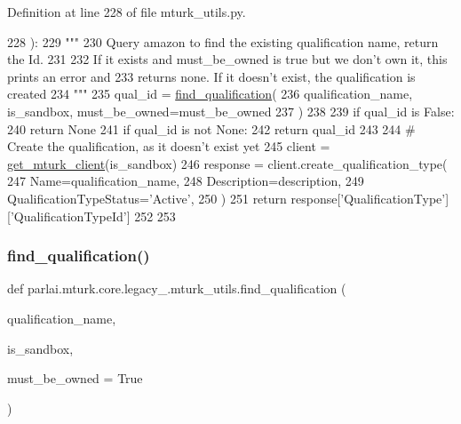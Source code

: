 Definition at line 228 of file mturk\+\_\+utils.\+py.


\begin{DoxyCode}
228 ):
229     \textcolor{stringliteral}{"""}
230 \textcolor{stringliteral}{    Query amazon to find the existing qualification name, return the Id.}
231 \textcolor{stringliteral}{}
232 \textcolor{stringliteral}{    If it exists and must\_be\_owned is true but we don't own it, this prints an error and}
233 \textcolor{stringliteral}{    returns none. If it doesn't exist, the qualification is created}
234 \textcolor{stringliteral}{    """}
235     qual\_id = \hyperlink{namespaceparlai_1_1mturk_1_1core_1_1mturk__utils_a54121023abc81124ba03cc50d5f23af3}{find\_qualification}(
236         qualification\_name, is\_sandbox, must\_be\_owned=must\_be\_owned
237     )
238 
239     \textcolor{keywordflow}{if} qual\_id \textcolor{keywordflow}{is} \textcolor{keyword}{False}:
240         \textcolor{keywordflow}{return} \textcolor{keywordtype}{None}
241     \textcolor{keywordflow}{if} qual\_id \textcolor{keywordflow}{is} \textcolor{keywordflow}{not} \textcolor{keywordtype}{None}:
242         \textcolor{keywordflow}{return} qual\_id
243 
244     \textcolor{comment}{# Create the qualification, as it doesn't exist yet}
245     client = \hyperlink{namespaceparlai_1_1mturk_1_1core_1_1mturk__utils_a577e2527c04682284394b0951a090695}{get\_mturk\_client}(is\_sandbox)
246     response = client.create\_qualification\_type(
247         Name=qualification\_name,
248         Description=description,
249         QualificationTypeStatus=\textcolor{stringliteral}{'Active'},
250     )
251     \textcolor{keywordflow}{return} response[\textcolor{stringliteral}{'QualificationType'}][\textcolor{stringliteral}{'QualificationTypeId'}]
252 
253 
\end{DoxyCode}
\mbox{\label{namespaceparlai_1_1mturk_1_1core_1_1legacy__2018_1_1mturk__utils_ad152f1d9ea255ea9f365695f56e0cc5f}} 
\subsubsection{\texorpdfstring{find\+\_\+qualification()}{find\_qualification()}}
{\footnotesize\ttfamily def parlai.\+mturk.\+core.\+legacy\+\_.\+mturk\+\_\+utils.\+find\+\_\+qualification (\begin{DoxyParamCaption}\item[{}]{qualification\+\_\+name,  }\item[{}]{is\+\_\+sandbox,  }\item[{}]{must\+\_\+be\+\_\+owned = {\ttfamily True} }\end{DoxyParamCaption})}

